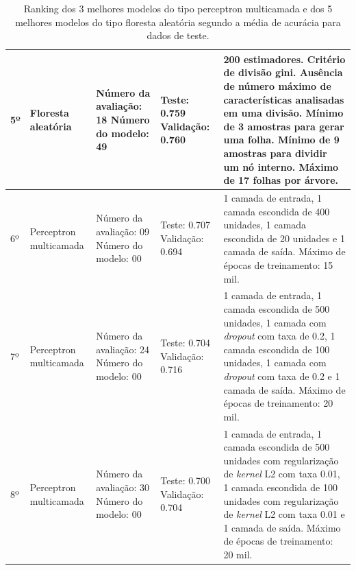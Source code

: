 \begin{table}[ht!]
\begin{center}
{\begin{tabular}{|p{1.25cm}|p{2cm}|p{2cm}|p{2.5cm}|p{6.75cm}|}
    \hline
    5º & Floresta \newline aleatória & Número da \newline avaliação: 18 \newline Número do \newline modelo: 49 & Teste: 0.759 \newline Validação: 0.760 & 200 estimadores. Critério de divisão gini. Ausência de número máximo de características analisadas em uma divisão. Mínimo de 3 amostras para gerar uma folha. Mínimo de 9 amostras para dividir um nó interno. Máximo de 17 folhas por árvore. \\
    \hline
    6º & Perceptron multicamada & Número da \newline avaliação: 09 \newline Número do \newline modelo: 00 & Teste: 0.707 \newline Validação: 0.694 & 1 camada de entrada, 1 camada escondida de 400 unidades, 1 camada escondida de 20 unidades e 1 camada de saída. Máximo de épocas de treinamento: 15 mil. \\
    \hline
    7º & Perceptron multicamada & Número da \newline avaliação: 24 \newline Número do \newline modelo: 00 & Teste: 0.704 \newline Validação: 0.716 & 1 camada de entrada, 1 camada escondida de 500 unidades, 1 camada com \textit{dropout} com taxa de 0.2, 1 camada escondida de 100 unidades, 1 camada com \textit{dropout} com taxa de 0.2 e 1 camada de saída. Máximo de épocas de treinamento: 20 mil. \\
    \hline
    8º & Perceptron multicamada & Número da \newline avaliação: 30 \newline Número do \newline modelo: 00 & Teste: 0.700 \newline Validação: 0.704 & 1 camada de entrada, 1 camada escondida de 500 unidades com regularização de \textit{kernel} L2 com taxa 0.01, 1 camada escondida de 100 unidades com regularização de \textit{kernel} L2 com taxa 0.01 e 1 camada de saída. Máximo de épocas de treinamento: 20 mil. \\
    \hline
    \end{tabular}
  }
  \caption{Ranking dos 3 melhores modelos do tipo perceptron multicamada e dos 5 melhores modelos do tipo floresta aleatória segundo a média de acurácia para dados de teste.}
  \label{table:ranking_melhores_modelos}
  \end{center}
\end{table}

